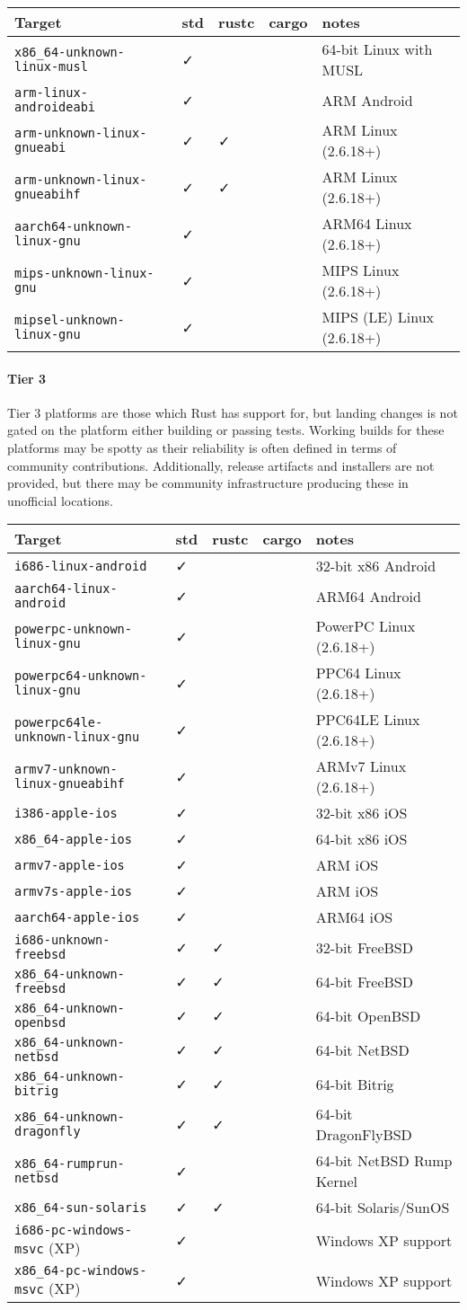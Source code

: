 \documentclass[a4paper,]{book}
\let\oldparagraph\paragraph
\renewcommand{\paragraph}[1]{\oldparagraph{#1}\mbox{}}
\begin{document}
\begin{longtable}[c]{@{}lllll@{}}
\toprule
Target & std & rustc & cargo & notes\tabularnewline
\midrule
\endhead
\texttt{x86\_64-unknown-linux-musl} & ✓ & & & 64-bit Linux with
MUSL\tabularnewline
\texttt{arm-linux-androideabi} & ✓ & & & ARM Android\tabularnewline
\texttt{arm-unknown-linux-gnueabi} & ✓ & ✓ & & ARM Linux
(2.6.18+)\tabularnewline
\texttt{arm-unknown-linux-gnueabihf} & ✓ & ✓ & & ARM Linux
(2.6.18+)\tabularnewline
\texttt{aarch64-unknown-linux-gnu} & ✓ & & & ARM64 Linux
(2.6.18+)\tabularnewline
\texttt{mips-unknown-linux-gnu} & ✓ & & & MIPS Linux
(2.6.18+)\tabularnewline
\texttt{mipsel-unknown-linux-gnu} & ✓ & & & MIPS (LE) Linux
(2.6.18+)\tabularnewline
\bottomrule
\end{longtable}

\paragraph{Tier 3}\label{tier-3}

Tier 3 platforms are those which Rust has support for, but landing
changes is not gated on the platform either building or passing tests.
Working builds for these platforms may be spotty as their reliability is
often defined in terms of community contributions. Additionally, release
artifacts and installers are not provided, but there may be community
infrastructure producing these in unofficial locations.

\begin{longtable}[c]{@{}lllll@{}}
\toprule
Target & std & rustc & cargo & notes\tabularnewline
\midrule
\endhead
\texttt{i686-linux-android} & ✓ & & & 32-bit x86 Android\tabularnewline
\texttt{aarch64-linux-android} & ✓ & & & ARM64 Android\tabularnewline
\texttt{powerpc-unknown-linux-gnu} & ✓ & & & PowerPC Linux
(2.6.18+)\tabularnewline
\texttt{powerpc64-unknown-linux-gnu} & ✓ & & & PPC64 Linux
(2.6.18+)\tabularnewline
\texttt{powerpc64le-unknown-linux-gnu} & ✓ & & & PPC64LE Linux
(2.6.18+)\tabularnewline
\texttt{armv7-unknown-linux-gnueabihf} & ✓ & & & ARMv7 Linux
(2.6.18+)\tabularnewline
\texttt{i386-apple-ios} & ✓ & & & 32-bit x86 iOS\tabularnewline
\texttt{x86\_64-apple-ios} & ✓ & & & 64-bit x86 iOS\tabularnewline
\texttt{armv7-apple-ios} & ✓ & & & ARM iOS\tabularnewline
\texttt{armv7s-apple-ios} & ✓ & & & ARM iOS\tabularnewline
\texttt{aarch64-apple-ios} & ✓ & & & ARM64 iOS\tabularnewline
\texttt{i686-unknown-freebsd} & ✓ & ✓ & & 32-bit FreeBSD\tabularnewline
\texttt{x86\_64-unknown-freebsd} & ✓ & ✓ & & 64-bit
FreeBSD\tabularnewline
\texttt{x86\_64-unknown-openbsd} & ✓ & ✓ & & 64-bit
OpenBSD\tabularnewline
\texttt{x86\_64-unknown-netbsd} & ✓ & ✓ & & 64-bit NetBSD\tabularnewline
\texttt{x86\_64-unknown-bitrig} & ✓ & ✓ & & 64-bit Bitrig\tabularnewline
\texttt{x86\_64-unknown-dragonfly} & ✓ & ✓ & & 64-bit
DragonFlyBSD\tabularnewline
\texttt{x86\_64-rumprun-netbsd} & ✓ & & & 64-bit NetBSD Rump
Kernel\tabularnewline
\texttt{x86\_64-sun-solaris} & ✓ & ✓ & & 64-bit
Solaris/SunOS\tabularnewline
\texttt{i686-pc-windows-msvc} (XP) & ✓ & & & Windows XP
support\tabularnewline
\texttt{x86\_64-pc-windows-msvc} (XP) & ✓ & & & Windows XP
support\tabularnewline
\bottomrule
\end{longtable}
\end{document}
